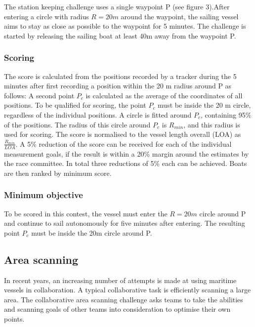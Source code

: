 \documentclass[12pt]{article}
\begin{document}
The station keeping challenge uses a single waypoint P
(see figure 3).After entering a circle with radius $R=20m$ around the waypoint, the 
sailing vessel aims to stay as close as possible to the waypoint for 5 minutes.
The challenge is started by releasing the sailing boat at least 40m away
from the waypoint P.

\subsubsection{Scoring}
The score is calculated from the positions recorded by a tracker during the 5
minutes after first recording a position within the 20 m radius around P as
follows:
A second point $P_c$ is calculated as the average of the coordinates of all
positions. To be qualified for scoring, the point $P_c$ must be
inside the 20 m circle, regardless of the individual positions.
A circle is fitted around $P_c$, containing 95\% of the positions.
The radius of this circle around $P_c$ is $R_{min}$, and this radius is used for
scoring. The score is normalised to the vessel length overall (LOA) as 
$\frac{R_{min}}{LOA}$. 
A 5\% reduction of the score can be received for each of the individual
measurement goals, if the result is within a 20\% margin around 
the estimates by the race committee. In total three reductions of 5\%
each can be achieved. Boats are then ranked by minimum score.

\subsubsection{Minimum objective}
To be scored in this contest, the vessel must enter the $R=20m$ circle around P
and continue to sail autonomously for five minutes after entering. The resulting 
point $P_c$ must be inside the 20m circle around P.

\subsection{Area scanning}
In recent years, an increasing number of attempts is made at using maritime
vessels in collaboration. A typical
collaborative task is efficiently scanning a large area.
The collaborative area scanning challenge asks teams to take the abilities and
scanning goals of other teams into consideration to optimise their own points.
\end{document}
